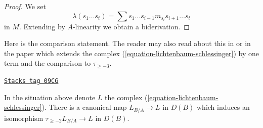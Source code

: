 \begin{proof}
We set
$$
\lambda(s_1 \ldots s_t) =
\sum s_1 \ldots s_{i - 1} m_{s_i} s_{i + 1} \ldots s_t
$$
in $M$. Extending by $A$-linearity we obtain a biderivation.
\end{proof}

Here is the comparison statement. The reader may also read about this
in \cite[page 206, Proposition 12]{Andre-Homologie} or in the paper
\cite{Doncel} which extends the complex
(\ref{equation-lichtenbaum-schlessinger}) by one term and the comparison
to $\tau_{\geq -3}$.

\begin{lemma}
\label{cotangent-lemma-compare-higher}
\href{https://stacks.math.columbia.edu/tag/09CG}{\texttt{Stacks tag 09CG}}

In the situation above denote $L$ the complex
(\ref{equation-lichtenbaum-schlessinger}).
There is a canonical map $L_{B/A} \to L$ in $D(B)$ which
induces an isomorphism $\tau_{\geq -2}L_{B/A} \to L$ in $D(B)$.
\end{lemma}


